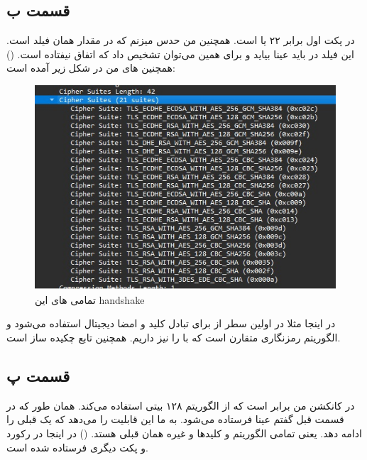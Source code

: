 \documentclass[]{article}
\begin{document}
\subsection*{قسمت ب}
در پکت اول
 برابر ۲۲ یا  است.
همچنین من حدس میزنم که در
مقدار
همان فیلد
است. این فیلد در
باید عینا بیاید و برای همین می‌توان تشخیص داد که
اتفاق نیفتاده است.
()
همچنین
های
من در شکل زیر آمده است:
\begin{figure}[h]
    \centering
    \includegraphics[scale=0.5]{pics/tls-ciphers.jpg}
    \caption{تمامی های این handshake}
\end{figure}
در اینجا مثلا در اولین سطر از
برای تبادل کلید و امضا دیجیتال استفاده می‌شود و الگوریتم رمزنگاری متقارن
است که با
را نیز داریم. همچنین تابع چکیده ساز
است.
\subsection*{قسمت پ}
در کانکشن من  برابر
است که از الگوریتم
 ۱۲۸ بیتی استفاده می‌کند.
همان طور که در قسمت قبل گفتم
عینا فرستاده می‌شود.
به ما این قابلیت را می‌دهد که یک
قبلی را ادامه دهد. یعنی تمامی الگوریتم و کلید‌ها و غیره همان قبلی هستد.
()
در اینجا
در رکورد و پکت دیگری فرستاده شده است.
\end{document}
